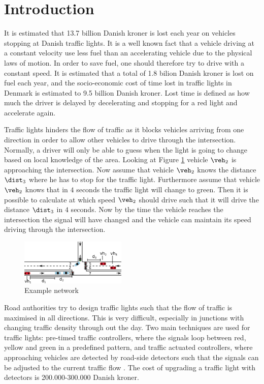 \section{Introduction}
It is estimated that 13.7 billion Danish kroner is lost each year on vehicles stopping at Danish traffic lights.\cite{Vejdir}
It is a well known fact that a vehicle driving at a constant velocity use less fuel than an accelerating vehicle due to the physical laws of motion.
In order to save fuel, one should therefore try to drive with a constant speed.
It is estimated that a total of 1.8 bilion Danish kroner is lost on fuel each year, and the socio-economic cost of time lost in traffic lights in Denmark is estimated to 9.5 billion Danish kroner. 
Lost time is defined as how much the driver is delayed by decelerating and stopping for a red light and accelerate again.

Traffic lights hinders the flow of traffic as it blocks vehicles arriving from one direction in order to allow other vehicles to drive through the intersection.
Normally, a driver will only be able to guess when the light is going to change based on local knowledge of the area. 
Looking at Figure \ref{fig:Introduction:network} vehicle $\veh_2$ is approaching the intersection.
Now assume that vehicle $\veh_2$ knows the distance $\dist_3$ where he has to stop for the traffic light. 
Furthermore assume that vehicle $\veh_2$ knows that in $4$ seconds the traffic light will change to green. 
Then it is possible to calculate at which speed $\veh_2$ should drive such that it will drive the distance $\dist_3$ in $4$ seconds. 
Now by the time the vehicle reaches the intersection the signal will have changed and the vehicle can maintain its speed driving through the intersection.
\begin{figure}[htb]
\centering
\includegraphics[width=0.45\textwidth]{../images/introNetwork.png}
\caption{Example network}
\label{fig:Introduction:network}
\end{figure}

Road authorities try to design traffic lights such that the flow of traffic is maximised in all directions.
This is very difficult, especially in junctions with changing traffic density through out the day.
Two main techniques are used for traffic lights: pre-timed traffic controllers, where the signals loop between red, yellow and green in a predefined pattern, and traffic actuated controllers, where approaching vehicles are detected by road-side detectors such that the signals can be adjusted to the current traffic flow \cite{Vejdir}.
The cost of upgrading a traffic light with detectors is 200.000-300.000 Danish kroner\cite{Vejdir}.

